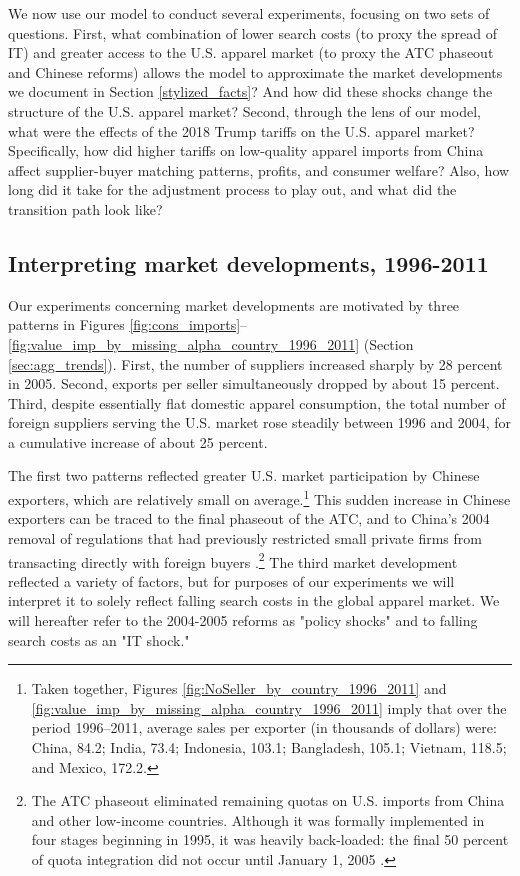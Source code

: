 \documentclass[12pt]{article} \usepackage{amsmath,amssymb,amsthm,geometry,graphicx,setspace,algorithm,algpseudocode,float}
\begin{document}
We now use our model to conduct several experiments, focusing on two sets of questions. First, what combination of lower search costs (to proxy the spread of IT) and greater access to the U.S. apparel market (to proxy the ATC phaseout and Chinese reforms) allows the model to approximate the market developments we document in Section \ref{stylized_facts}? And how did these shocks change the structure of the U.S. apparel market? Second, through the lens of our model, what were the effects of  the 2018 Trump tariffs on the U.S. apparel market? Specifically, how did higher tariffs on low-quality apparel imports from China affect supplier-buyer matching patterns, profits, and consumer welfare? Also, how long did it take for the adjustment process to play out, and what did the transition path look like? 

\subsection{Interpreting market developments, 1996-2011}
\label{sec:interpret_market}
Our experiments concerning market developments are motivated by three patterns in Figures \ref{fig:cons_imports}–\ref{fig:value_imp_by_missing_alpha_country_1996_2011} (Section \ref{sec:agg_trends}). First, the number of suppliers increased sharply by 28 percent in 2005. Second, exports per seller simultaneously dropped by about 15 percent. Third, despite essentially flat domestic apparel consumption, the total number of foreign suppliers serving the U.S. market rose steadily between 1996 and 2004, for a cumulative increase of about 25 percent.

The first two patterns reflected greater U.S. market participation by Chinese exporters, which are relatively small on average.\footnote{Taken together, Figures \ref{fig:NoSeller_by_country_1996_2011} and \ref{fig:value_imp_by_missing_alpha_country_1996_2011} imply that over the period 1996–2011, average sales per exporter (in thousands of dollars) were: China, 84.2; India, 73.4; Indonesia, 103.1; Bangladesh, 105.1; Vietnam, 118.5; and Mexico, 172.2.\medskip}  This sudden increase in Chinese exporters can be traced to the final phaseout of the ATC, and to China’s 2004 removal of regulations that had previously restricted small private firms from transacting directly with foreign buyers \citep{BaiKrishnaMa2017}.\footnote{The ATC phaseout eliminated remaining quotas on U.S. imports from China and other low-income countries. Although it was formally implemented in four stages beginning in 1995, it was heavily back-loaded: the final 50 percent of quota integration did not occur until January 1, 2005 \citep{kowalskiMolnar2009}.\medskip} The third market development reflected a variety of factors, but for purposes of our experiments we will interpret it to solely reflect falling search costs in the global apparel market. We will hereafter refer to the 2004-2005 reforms as "policy shocks" and to falling search costs as an "IT shock."
\end{document}
